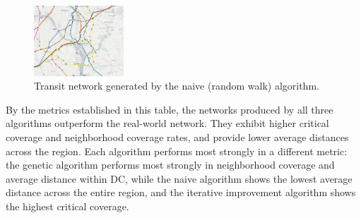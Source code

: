 \documentclass[sigconf,nonacm]{acmart}
\begin{document}
\begin{figure}[ht]
    \centering
    \includegraphics[width=0.3\textwidth]{./img/naive.png}
    \caption{Transit network generated by the naive (random walk) algorithm.}
    \label{fig:naive_network}
\end{figure}

\begin{table}[h]
\caption{Comparison of Network Designs on Key Metrics}
\label{tab:networkmetrics}
\end{table}

By the metrics established in this table, the networks produced by all three algorithms outperform the real-world network. They exhibit higher critical coverage and neighborhood coverage rates, and provide lower average distances across the region. Each algorithm performs most strongly in a different metric: the genetic algorithm performs most strongly in neighborhood coverage and average distance within DC, while the naive algorithm shows the lowest average distance across the entire region, and the iterative improvement algorithm shows the highest critical coverage. 
\end{document}
